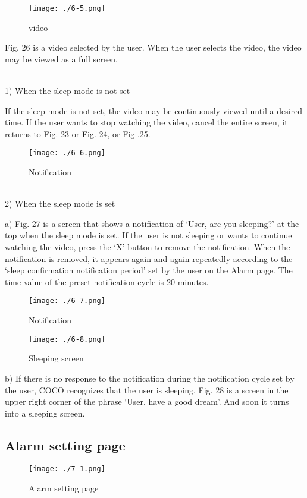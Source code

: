 \documentclass[conference]{IEEEtran}
\begin{document}
\begin{figure}[H]
\texttt{[image: ./6-5.png]}
\centering
\caption{video}
\end{figure}

Fig. 26 is a video selected by the user. When the user selects the video, the video may be viewed as a full screen.

\\1) When the sleep mode is not set

    If the sleep mode is not set, the video may be continuously viewed until a desired time. If the user wants to stop watching the video, cancel the entire screen, it returns to Fig. 23 or Fig. 24, or Fig .25.
    
\begin{figure}[H]
\texttt{[image: ./6-6.png]}
\centering
\caption{Notification}
\end{figure}

\\2) When the sleep mode is set

        a) Fig. 27 is a screen that shows a notification of ‘User, are you sleeping?’ at the top when the sleep mode is set. If the user is not sleeping or wants to continue watching the video, press the ‘X’ button to remove the notification. When the notification is removed, it appears again and again repeatedly according to the ‘sleep confirmation notification period’ set by the user on the Alarm page. The time value of the preset notification cycle is 20 minutes.
    

\begin{figure}[H]
\texttt{[image: ./6-7.png]}
\centering
\caption{Notification}
\end{figure}

\begin{figure}[H]
\texttt{[image: ./6-8.png]}
\centering
\caption{Sleeping screen}
\end{figure}

        b) If there is no response to the notification during the notification cycle set by the user, COCO recognizes that the user is sleeping. Fig. 28 is a screen in the upper right corner of the phrase ‘User, have a good dream’. And soon it turns into a sleeping screen.
        
\subsection{Alarm setting page}
\begin{figure}[H]
\texttt{[image: ./7-1.png]}
\centering
\caption{Alarm setting page}
\end{figure}
\end{document}
